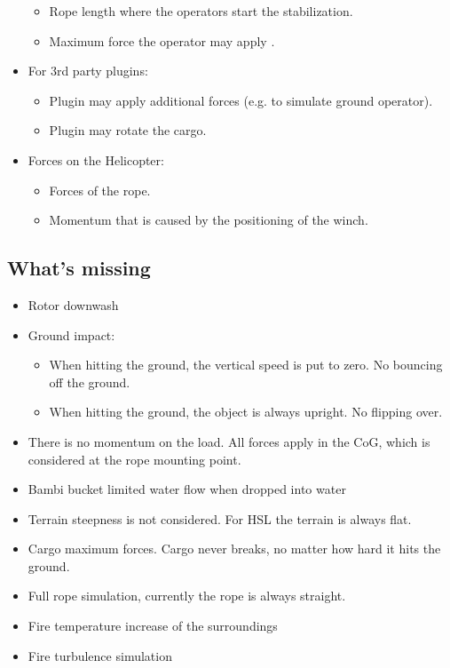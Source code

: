 \documentclass[10pt,a4]{scrartcl}
\begin{document}
\begin{itemize}
\begin{itemize}
\item Rope length where the operators start the stabilization.
\item Maximum force the operator may apply .
\end{itemize}
\item For 3rd party plugins:
\begin{itemize}
\item Plugin may apply additional forces (e.g. to simulate ground operator).
\item Plugin may rotate the cargo.
\end{itemize}
\item Forces on the Helicopter:
\begin{itemize}
\item Forces of the rope.
\item Momentum that is caused by the positioning of the winch.
\end{itemize}
\end{itemize}

\subsection{What's missing}

\begin{itemize}
\item Rotor downwash
\item Ground impact: 
\begin{itemize}
\item When hitting the ground, the vertical speed is put to zero. No bouncing off the ground.
\item When hitting the ground, the object is always upright. No flipping over.
\end{itemize}
\item There is no momentum on the load. All forces apply in the CoG, which is considered at the rope mounting point.
\item Bambi bucket limited water flow when dropped into water
\item Terrain steepness is not considered. For HSL the terrain is always flat.
\item Cargo maximum forces. Cargo never breaks, no matter how hard it hits the ground.
\item Full rope simulation, currently the rope is always straight.
\item Fire temperature increase of the surroundings
\item Fire turbulence simulation
\end{itemize}
\end{document}
